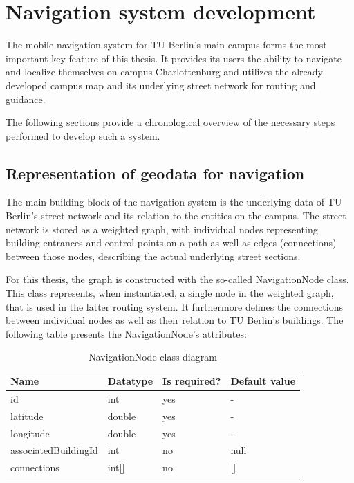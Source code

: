 \newpage

\section{Navigation system development}
The mobile navigation system for TU Berlin's main campus forms the most important key feature of this thesis. It provides its users the ability to navigate and localize themselves on campus Charlottenburg and utilizes the already developed campus map and its underlying street network for routing and guidance.

The following sections provide a chronological overview of the necessary steps performed to develop such a system.

\subsection{Representation of geodata for navigation}
The main building block of the navigation system is the underlying data of TU Berlin's street network and its relation to the entities on the campus. The street network is stored as a weighted graph, with individual nodes representing building entrances and control points on a path as well as edges (connections) between those nodes, describing the actual underlying street sections.

For this thesis, the graph is constructed with the so-called NavigationNode class. This class represents, when instantiated, a single node in the weighted graph, that is used in the latter routing system. It furthermore defines the connections between individual nodes as well as their relation to TU Berlin's buildings. The following table presents the NavigationNode's attributes:

\begin{table}[!ht]
	\small
	\centering
	\begin{tabular}{|l|l|l|l|}
		\hline
		\textbf{Name}           & \textbf{Datatype}     & \textbf{Is required?}       	& \textbf{Default value} 	\\
		\hline
        id               		& int	              	& yes                          	& - 				\\
		\hline
        latitude                & double              	& yes                          	& - 				\\
		\hline
		longitude               & double              	& yes                          	& - 				\\
		\hline
		associatedBuildingId    & int              		& no                          	& null 				\\
		\hline
		connections    			& int[]              	& no                          	& [] 				\\
		\hline
	\end{tabular}
	\caption{NavigationNode class diagram}
\end{table}

